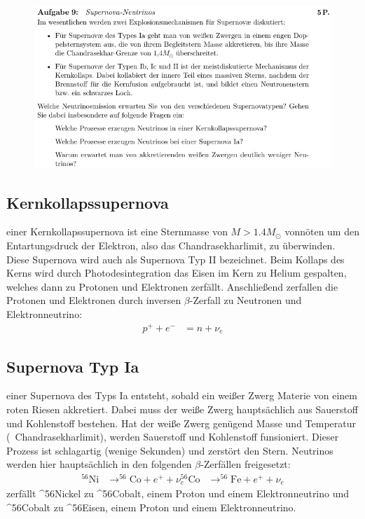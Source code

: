 \begin{figure}[H]
    \centering
    \includegraphics[width=\textwidth]{images/Aufgabe9.jpg}
    \label{fig:6}
\end{figure}

    \subsection{Kernkollapssupernova}

    \justifying einer Kernkollapssupernova ist eine Sternmasse von $M>1.4M_{\odot}$ vonnöten um den Entartungsdruck der Elektron,
    also das Chandrasekharlimit, zu überwinden. Diese Supernova wird auch als Supernova Typ II bezeichnet. Beim Kollaps des Kerns wird durch
    Photodesintegration das Eisen im Kern zu Helium gespalten, welches dann zu Protonen und Elektronen zerfällt. Anschließend zerfallen
    die Protonen und Elektronen durch inversen $\beta$-Zerfall zu Neutronen und Elektronneutrino:
    \begin{align*}
        p^+ + e^- &= n + \nu_e
    \end{align*}

    \subsection{Supernova Typ Ia}

    \justifying einer Supernova des Typs Ia entsteht, sobald ein weißer Zwerg Materie von einem roten Riesen akkretiert. 
    Dabei muss der weiße Zwerg hauptsächlich aus Sauerstoff und Kohlenstoff bestehen. Hat der weiße Zwerg genügend Masse und Temperatur
    (~Chandrasekharlimit), werden Sauerstoff und Kohlenstoff funsioniert. Dieser Prozess ist schlagartig (wenige Sekunden) und zerstört den
    Stern. Neutrinos werden hier hauptsächlich in den folgenden $\beta$-Zerfällen freigesetzt:
    \begin{align*}
        ^{56}\text{Ni} &\to ^{56}\text{Co} + e^+ + \nu_e
        ^{56}\text{Co} &\to ^{56}\text{Fe} + e^+ + \nu_e
    \end{align*}
    \justifying zerfällt ^{56}Nickel zu ^{56}Cobalt, einem Proton und einem Elektronneutrino und ^{56}Cobalt zu ^{56}Eisen, einem Proton und 
    einem Elektronneutrino.

